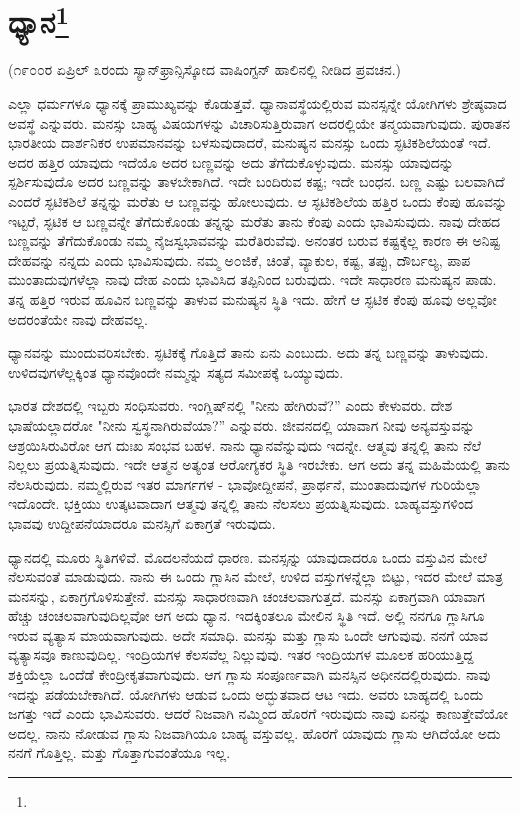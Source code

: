 
\chapter[ಧ್ಯಾನ]{ಧ್ಯಾನ\protect\footnote{}}

\begin{center}
(೧೯೦೦ರ ಏಪ್ರಿಲ್ ೩ರಂದು ಸ್ಯಾನ್‌ಫ್ರಾನ್ಸಿಸ್ಕೋದ ವಾಷಿಂಗ್ಟನ್ ಹಾಲಿನಲ್ಲಿ ನೀಡಿದ ಪ್ರವಚನ.)
\end{center}

ಎಲ್ಲಾ ಧರ್ಮಗಳೂ ಧ್ಯಾನಕ್ಕೆ ಪ್ರಾಮುಖ್ಯವನ್ನು ಕೊಡುತ್ತವೆ. ಧ್ಯಾನಾವಸ್ಥೆಯಲ್ಲಿರುವ ಮನಸ್ಸನ್ನೇ ಯೋಗಿಗಳು ಶ್ರೇಷ್ಠವಾದ ಅವಸ್ಥೆ ಎನ್ನುವರು. ಮನಸ್ಸು ಬಾಹ್ಯ ವಿಷಯಗಳನ್ನು ವಿಚಾರಿಸುತ್ತಿರುವಾಗ ಅದರಲ್ಲಿಯೇ ತನ್ಮಯವಾಗುವುದು. ಪುರಾತನ ಭಾರತೀಯ ದಾರ್ಶನಿಕರ ಉಪಮಾನವನ್ನು ಬಳಸುವುದಾದರೆ, ಮನುಷ್ಯನ ಮನಸ್ಸು ಒಂದು ಸ್ಫಟಿಕಶಿಲೆಯಂತೆ ಇದೆ. ಅದರ ಹತ್ತಿರ ಯಾವುದು ಇದೆಯೊ ಅದರ ಬಣ್ಣವನ್ನು ಅದು ತೆಗೆದುಕೊಳ್ಳುವುದು. ಮನಸ್ಸು ಯಾವುದನ್ನು ಸ್ಪರ್ಶಿಸುವುದೊ ಅದರ ಬಣ್ಣವನ್ನು ತಾಳಬೇಕಾಗಿದೆ. ಇದೇ ಬಂದಿರುವ ಕಷ್ಟ; ಇದೇ ಬಂಧನ. ಬಣ್ಣ ಎಷ್ಟು ಬಲವಾಗಿದೆ ಎಂದರೆ ಸ್ಫಟಿಕಶಿಲೆ ತನ್ನನ್ನು ಮರೆತು ಆ ಬಣ್ಣವನ್ನು ಹೋಲುವುದು. ಆ ಸ್ಫಟಿಕಶಿಲೆಯ ಹತ್ತಿರ ಒಂದು ಕೆಂಪು ಹೂವನ್ನು ಇಟ್ಟರೆ, ಸ್ಫಟಿಕ ಆ ಬಣ್ಣವನ್ನೇ ತೆಗೆದುಕೊಂಡು ತನ್ನನ್ನು ಮರೆತು ತಾನು ಕೆಂಪು ಎಂದು ಭಾವಿಸುವುದು. ನಾವು ದೇಹದ ಬಣ್ಣವನ್ನು ತೆಗೆದುಕೊಂಡು ನಮ್ಮ ನೈಜಸ್ವಭಾವವನ್ನು ಮರೆತಿರುವೆವು. ಅನಂತರ ಬರುವ ಕಷ್ಟಕ್ಕೆಲ್ಲ ಕಾರಣ ಈ ಅನಿಷ್ಟ ದೇಹವನ್ನು ನನ್ನದು ಎಂದು ಭಾವಿಸುವುದು. ನಮ್ಮ ಅ೦ಜಿಕೆ, ಚಿಂತೆ, ವ್ಯಾಕುಲ, ಕಷ್ಟ, ತಪ್ಪು, ದೌರ್ಬಲ್ಯ, ಪಾಪ ಮುಂತಾದುವುಗಳೆಲ್ಲಾ ನಾವು ದೇಹ ಎಂದು ಭಾವಿಸಿದ ತಪ್ಪಿನಿಂದ ಬರುವುದು. ಇದೇ ಸಾಧಾರಣ ಮನುಷ್ಯನ ಪಾಡು. ತನ್ನ ಹತ್ತಿರ ಇರುವ ಹೂವಿನ ಬಣ್ಣವನ್ನು ತಾಳುವ ಮನುಷ್ಯನ ಸ್ಥಿತಿ ಇದು. ಹೇಗೆ ಆ ಸ್ಫಟಿಕ ಕೆಂಪು ಹೂವು ಅಲ್ಲವೋ ಅದರಂತೆಯೇ ನಾವು ದೇಹವಲ್ಲ.

ಧ್ಯಾನವನ್ನು ಮುಂದುವರಿಸಬೇಕು. ಸ್ಫಟಿಕಕ್ಕೆ ಗೊತ್ತಿದೆ ತಾನು ಏನು ಎಂಬುದು. ಅದು ತನ್ನ ಬಣ್ಣವನ್ನು ತಾಳುವುದು. ಉಳಿದವುಗಳೆಲ್ಲಕ್ಕಿಂತ ಧ್ಯಾನವೊಂದೇ ನಮ್ಮನ್ನು ಸತ್ಯದ ಸಮೀಪಕ್ಕೆ ಒಯ್ಯುವುದು.

ಭಾರತ ದೇಶದಲ್ಲಿ ಇಬ್ಬರು ಸಂಧಿಸುವರು. ಇಂಗ್ಲಿಷ್‌ನಲ್ಲಿ "ನೀನು ಹೇಗಿರುವೆ?” ಎಂದು ಕೇಳುವರು. ದೇಶ ಭಾಷೆಯಲ್ಲಾದರೋ "ನೀನು ಸ್ವಸ್ಥನಾಗಿರುವೆಯಾ?” ಎನ್ನುವರು. ಜೀವನದಲ್ಲಿ ಯಾವಾಗ ನೀವು ಅನ್ಯವಸ್ತುವನ್ನು ಆಶ್ರಯಿಸಿರುವಿರೋ ಆಗ ದುಃಖ ಸಂಭವ ಬಹಳ. ನಾನು ಧ್ಯಾನವೆನ್ನುವುದು ಇದನ್ನೇ. ಆತ್ಮವು ತನ್ನಲ್ಲಿ ತಾನು ನೆಲೆ ನಿಲ್ಲಲು ಪ್ರಯತ್ನಿಸುವುದು. ಇದೇ ಆತ್ಮನ ಅತ್ಯಂತ ಆರೋಗ್ಯಕರ ಸ್ಥಿತಿ ಇರಬೇಕು. ಆಗ ಅದು ತನ್ನ ಮಹಿಮೆಯಲ್ಲಿ ತಾನು ನೆಲಸಿರುವುದು. ನಮ್ಮಲ್ಲಿರುವ ಇತರ ಮಾರ್ಗಗಳ - ಭಾವೋದ್ದೀಪನೆ, ಪ್ರಾರ್ಥನೆ, ಮುಂತಾದುವುಗಳ ಗುರಿಯೆಲ್ಲಾ ಇದೊಂದೇ. ಭಕ್ತಿಯು ಉತ್ಕಟವಾದಾಗ ಆತ್ಮವು ತನ್ನಲ್ಲಿ ತಾನು ನೆಲಸಲು ಪ್ರಯತ್ನಿಸುವುದು. ಬಾಹ್ಯವಸ್ತುಗಳಿಂದ ಭಾವವು ಉದ್ದೀಪನೆಯಾದರೂ ಮನಸ್ಸಿಗೆ ಏಕಾಗ್ರತೆ ಇರುವುದು.

ಧ್ಯಾನದಲ್ಲಿ ಮೂರು ಸ್ಥಿತಿಗಳಿವೆ. ಮೊದಲನೆಯದೆ ಧಾರಣ. ಮನಸ್ಸನ್ನು ಯಾವುದಾದರೂ ಒಂದು ವಸ್ತುವಿನ ಮೇಲೆ ನೆಲಸುವಂತೆ ಮಾಡುವುದು. ನಾನು ಈ ಒಂದು ಗ್ಲಾಸಿನ ಮೇಲೆ, ಉಳಿದ ವಸ್ತುಗಳನ್ನೆಲ್ಲಾ ಬಿಟ್ಟು, ಇದರ ಮೇಲೆ ಮಾತ್ರ ಮನಸನ್ನು, ಏಕಾಗ್ರಗೊಳಿಸುತ್ತೇನೆ. ಮನಸ್ಸು ಸಾಧಾರಣವಾಗಿ ಚಂಚಲವಾಗುತ್ತದೆ. ಮನಸ್ಸು ಏಕಾಗ್ರವಾಗಿ ಯಾವಾಗ ಹೆಚ್ಚು ಚಂಚಲವಾಗುವುದಿಲ್ಲವೋ ಆಗ ಅದು ಧ್ಯಾನ. ಇದಕ್ಕಿಂತಲೂ ಮೇಲಿನ ಸ್ಥಿತಿ ಇದೆ. ಅಲ್ಲಿ ನನಗೂ ಗ್ಲಾಸಿಗೂ ಇರುವ ವ್ಯತ್ಯಾಸ ಮಾಯವಾಗುವುದು. ಅದೇ ಸಮಾಧಿ. ಮನಸ್ಸು ಮತ್ತು ಗ್ಲಾಸು ಒಂದೇ ಆಗುವುವು. ನನಗೆ ಯಾವ ವ್ಯತ್ಯಾಸವೂ ಕಾಣುವುದಿಲ್ಲ. ಇಂದ್ರಿಯಗಳ ಕೆಲಸವೆಲ್ಲ ನಿಲ್ಲುವುವು. ಇತರ ಇಂದ್ರಿಯಗಳ ಮೂಲಕ ಹರಿಯುತ್ತಿದ್ದ ಶಕ್ತಿಯೆಲ್ಲಾ ಒಂದೆಡೆ ಕೇಂದ್ರೀಕೃತವಾಗುವುದು. ಆಗ ಗ್ಲಾಸು ಸಂಪೂರ್ಣವಾಗಿ ಮನಸ್ಸಿನ ಅಧೀನದಲ್ಲಿರುವುದು. ನಾವು ಇದನ್ನು ಪಡೆಯಬೇಕಾಗಿದೆ. ಯೋಗಿಗಳು ಆಡುವ ಒಂದು ಅದ್ಭುತವಾದ ಆಟ ಇದು. ಅವರು ಬಾಹ್ಯದಲ್ಲಿ ಒಂದು ಜಗತ್ತು ಇದೆ ಎಂದು ಭಾವಿಸುವರು. ಆದರೆ ನಿಜವಾಗಿ ನಮ್ಮಿಂದ ಹೊರಗೆ ಇರುವುದು ನಾವು ಏನನ್ನು ಕಾಣುತ್ತೇವೆಯೋ ಅದಲ್ಲ. ನಾನು ನೋಡುವ ಗ್ಲಾಸು ನಿಜವಾಗಿಯೂ ಬಾಹ್ಯ ವಸ್ತುವಲ್ಲ. ಹೊರಗೆ ಯಾವುದು ಗ್ಲಾಸು ಆಗಿದೆಯೋ ಅದು ನನಗೆ ಗೊತ್ತಿಲ್ಲ. ಮತ್ತು ಗೊತ್ತಾಗುವಂತೆಯೂ ಇಲ್ಲ.

